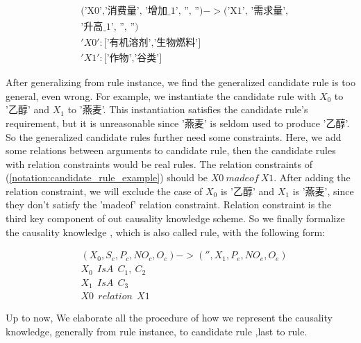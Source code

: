 \begin{equation}
\begin{split}
&\text{('X0','消费量', '增加\_1', '', '')}-> \text{('X1', '需求量',}\\
&\text{'升高\_1', '', '')} \\
&'X0':\text{['有机溶剂','生物燃料']}\\
&'X1':\text{['作物','谷类']}
\end{split}
\label{notation:candidate_rule_example}
\end{equation}

After generalizing from rule instance, we find the generalized candidate rule is too general, even wrong. For example, we instantiate the candidate rule with $X_0$ to '乙醇' and $X_1$ to '燕麦'. This instantiation satisfies the candidate rule's requirement, but it is unreasonable since '燕麦' is seldom used to produce '乙醇'. So the generalized candidate rules further need some constraints. Here, we add some relations between arguments to candidate rule, then the candidate rules with relation constraints would be real rules. The relation constraints of (\ref{notation:candidate_rule_example}) should be $X0 \ madeof \ X1$. After adding the relation constraint, we will exclude the case of $X_0$ is '乙醇' and $X_1$ is '燕麦', since they don't satisfy the 'madeof' relation constraint. Relation constraint is the third key component of out causality knowledge scheme. So we finally formalize the causality knowledge , which is also called rule, with the following form:

\begin{equation}
\begin{split}
&(X_0, S_c, P_c, NO_c, O_c)->('', X_1, P_e, NO_e, O_e)\\
&X_0 \ \ IsA \ \ C_1,\ C_2\\
&X_1 \ \ IsA \ \ C_3\\
&X0 \ \ relation \ \ X1 
\end{split}
\label{equ:rule_notation}
\end{equation}

Up to now, We elaborate all the procedure of how we represent the causality knowledge, generally from rule instance, to candidate rule ,last to rule.
 

